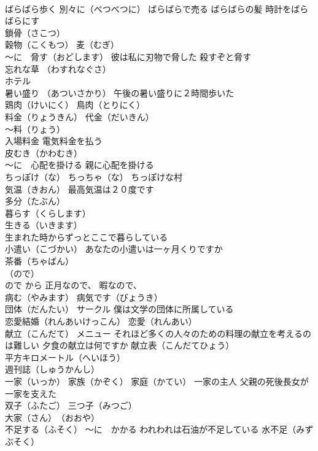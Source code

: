 \documentclass[8pt]{extreport}
\begin{document}
\begin{CJK}{UTF8}{min}
\\	ばらばら歩く 別々に（べつべつに） ばらばらで売る ばらばらの髪 時計をばらばらにす
\\	鎖骨（さこつ）
\\	穀物（こくもつ） 麦（むぎ）
\\	～に　脅す（おどします） 彼は私に刃物で脅した 殺すぞと脅す
\\	忘れな草 （わすれなぐさ）
\\	ホテル
\\	暑い盛り （あついさかり） 午後の暑い盛りに２時間歩いた
\\	鶏肉（けいにく） 鳥肉（とりにく）
\\	料金（りょうきん） 代金（だいきん）
\\	～料（りょう） 
\\	入場料金 電気料金を払う
\\	皮むき（かわむき）
\\	～に　心配を掛ける 親に心配を掛ける
\\	ちっぽけ（な） ちっちゃ（な） ちっぽけな村
\\	気温（きおん） 最高気温は２０度です
\\	多分（たぶん）
\\	暮らす（くらします） 
\\	生きる（いきます） 
\\	生まれた時からずっとここで暮らしている
\\	小遣い（こづかい） あなたの小遣いは一ヶ月くりですか
\\	茶番（ちゃばん）
\\	（ので）　
\\	ので から 正月なので、 暇なので、
\\	病む（やみます） 病気です（びょうき）
\\	団体（だんたい） サークル 僕は文学の団体に所属している
\\	恋愛結婚（れんあいけっこん） 恋愛（れんあい）
\\	献立（こんだて） メニュー それほど多くの人々のための料理の献立を考えるのは難しい 夕食の献立は何ですか 献立表（こんだてひょう）
\\	平方キロメートル（へいほう）
\\	週刊誌（しゅうかんし）
\\	一家（いっか） 家族（かぞく） 家庭（かてい） 一家の主人 父親の死後長女が一家を支えた
\\	双子（ふたご） 三つ子（みつご）
\\	大家（さん）　（おおや）
\\	不足する（ふそく） ～に　かかる われわれは石油が不足している 水不足（みずぶそく）

\end{CJK}
\end{document}
